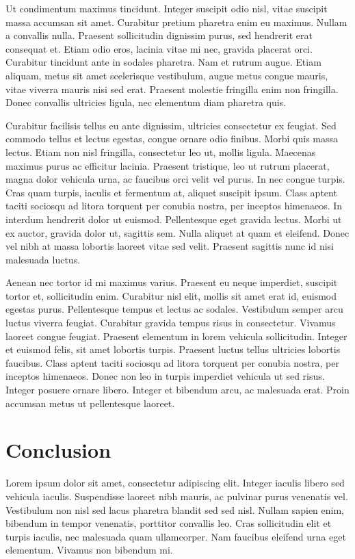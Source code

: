 \documentclass{custom_article}
\begin{document}
Ut condimentum maximus tincidunt. Integer suscipit odio nisl, vitae suscipit massa accumsan sit amet. Curabitur pretium pharetra enim eu maximus. Nullam a convallis nulla. Praesent sollicitudin dignissim purus, sed hendrerit erat consequat et. Etiam odio eros, lacinia vitae mi nec, gravida placerat orci. Curabitur tincidunt ante in sodales pharetra. Nam et rutrum augue. Etiam aliquam, metus sit amet scelerisque vestibulum, augue metus congue mauris, vitae viverra mauris nisi sed erat. Praesent molestie fringilla enim non fringilla. Donec convallis ultricies ligula, nec elementum diam pharetra quis.

Curabitur facilisis tellus eu ante dignissim, ultricies consectetur ex feugiat. Sed commodo tellus et lectus egestas, congue ornare odio finibus. Morbi quis massa lectus. Etiam non nisl fringilla, consectetur leo ut, mollis ligula. Maecenas maximus purus ac efficitur lacinia. Praesent tristique, leo ut rutrum placerat, magna dolor vehicula urna, ac faucibus orci velit vel purus. In nec congue turpis. Cras quam turpis, iaculis et fermentum at, aliquet suscipit ipsum. Class aptent taciti sociosqu ad litora torquent per conubia nostra, per inceptos himenaeos. In interdum hendrerit dolor ut euismod. Pellentesque eget gravida lectus. Morbi ut ex auctor, gravida dolor ut, sagittis sem. Nulla aliquet at quam et eleifend. Donec vel nibh at massa lobortis laoreet vitae sed velit. Praesent sagittis nunc id nisi malesuada luctus.

Aenean nec tortor id mi maximus varius. Praesent eu neque imperdiet, suscipit tortor et, sollicitudin enim. Curabitur nisl elit, mollis sit amet erat id, euismod egestas purus. Pellentesque tempus et lectus ac sodales. Vestibulum semper arcu luctus viverra feugiat. Curabitur gravida tempus risus in consectetur. Vivamus laoreet congue feugiat. Praesent elementum in lorem vehicula sollicitudin. Integer et euismod felis, sit amet lobortis turpis. Praesent luctus tellus ultricies lobortis faucibus. Class aptent taciti sociosqu ad litora torquent per conubia nostra, per inceptos himenaeos. Donec non leo in turpis imperdiet vehicula ut sed risus. Integer posuere ornare libero. Integer et bibendum arcu, ac malesuada erat. Proin accumsan metus ut pellentesque laoreet. 

\section{Conclusion}

Lorem ipsum dolor sit amet, consectetur adipiscing elit. Integer iaculis libero sed vehicula iaculis. Suspendisse laoreet nibh mauris, ac pulvinar purus venenatis vel. Vestibulum non nisl sed lacus pharetra blandit sed sed nisl. Nullam sapien enim, bibendum in tempor venenatis, porttitor convallis leo. Cras sollicitudin elit et turpis iaculis, nec malesuada quam ullamcorper. Nam faucibus eleifend urna eget elementum. Vivamus non bibendum mi.
\end{document}
